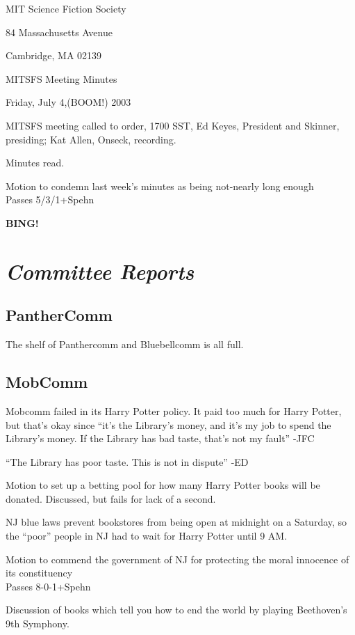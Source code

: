 \documentclass[12pt]{article}
\newcommand{\bing}{{\bf BING!} }
\newcommand{\goto}[1]{\bing \vskip 12pt \section*{{\em{#1}}}}
\begin{document}
\begin{center}

MIT Science Fiction Society 

84 Massachusetts Avenue

Cambridge, MA 02139

\vspace{12pt}

MITSFS Meeting Minutes 

Friday, July 4,(BOOM!) 2003

\end{center}
 
\vspace{18pt}

\setlength{\parskip}{6pt}

\noindent
MITSFS meeting called to order, 1700 SST, Ed Keyes, President and
Skinner, presiding; Kat Allen,  Onseck, recording.

Minutes read.

Motion to condemn last week's minutes as being not-nearly long enough \\
Passes 5/3/1+Spehn

\goto{Committee Reports}
\subsection*{PantherComm}
The shelf of Panthercomm and Bluebellcomm is all full.

\subsection*{MobComm}
Mobcomm failed in its Harry Potter policy.  It paid too much for Harry
Potter, but that's okay since ``it's the Library's money, and it's my
job to spend the Library's money.  If the Library has bad taste,
that's not my fault'' -JFC

``The Library has poor taste. This is not in dispute'' -ED

Motion to set up a betting pool for how many Harry Potter books will
be donated. Discussed, but fails for lack of a second.

NJ blue laws prevent bookstores from being open at midnight on a
Saturday, so the ``poor'' people in NJ had to wait for Harry Potter
until 9 AM.

Motion to commend the government of NJ for protecting the moral
innocence of its constituency\\
Passes 8-0-1+Spehn

Discussion of books which tell you how to end the world by playing
Beethoven's 9th Symphony.
\end{document}
